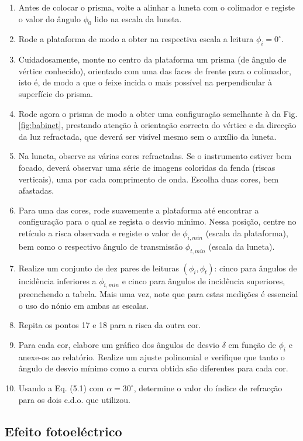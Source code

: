 \documentclass[12pt,a4paper,oneside]{paper}
\begin{document}
\begin{enumerate}
\item Antes de colocar o prisma, volte a alinhar a luneta com o colimador e registe o valor do ângulo $\phi_0$ lido na escala
da luneta.
\item Rode a plataforma de modo a obter na respectiva escala a leitura $\phi_i=0^\circ$.
\item Cuidadosamente, monte no centro da plataforma um prisma (de ângulo de vértice conhecido), orientado com uma das faces de
frente para o colimador, isto é, de modo a que o feixe incida o mais possível na perpendicular à superfície do prisma.
\item Rode agora o prisma de modo a obter uma configuração semelhante à da Fig. \ref{fig:babinet}, prestando atenção à orientação
correcta do vértice e da direcção da luz refractada, que deverá ser visível mesmo sem o auxílio da luneta.
\item  Na luneta, observe as várias cores refractadas.  Se o instrumento estiver bem focado, deverá  observar  uma  série  de
imagens coloridas da fenda (riscas verticais), uma por cada comprimento de onda. Escolha duas cores, bem afastadas. 
\item Para uma das cores, rode suavemente a plataforma até encontrar a configuração para o qual se regista o desvio mínimo.
Nessa posição, centre no retículo a risca observada e registe o valor de $\phi_{i,min}$ (escala da plataforma), bem como o
respectivo ângulo de transmissão $\phi_{t,min}$ (escala da luneta).
\item Realize um conjunto de dez pares de leituras $(\phi_i,\phi_t)$: cinco para ângulos de incidência inferiores a $\phi_{i,min}$ e cinco para ângulos de incidência superiores, preenchendo a tabela. Mais uma vez, note que para estas medições é essencial o uso do nónio em ambas as escalas.
\item Repita os pontos 17 e 18 para a risca da outra cor. 
\item Para cada cor, elabore um gráfico dos ângulos de desvio $\delta$ em função de $\phi_i$ e anexe-os ao relatório. Realize
um ajuste polinomial e verifique que tanto o ângulo de desvio mínimo como a curva obtida são diferentes para cada cor.
\item Usando a Eq. (5.1) com $\alpha=30^\circ$, determine o valor do índice de refracção para os dois c.d.o. que utilizou.
\end{enumerate}


\newpage
\subsection{\sf Efeito fotoeléctrico}
\end{document}
